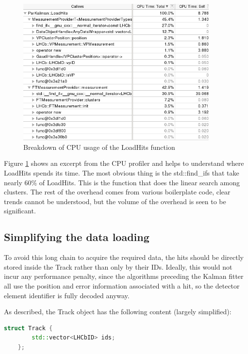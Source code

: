 \documentclass[12pt]{article}
\begin{document}
\begin{figure}[H]
	\begin{center}
		\includegraphics[width=0.9\textwidth]{kalmanfit_loadhits_breakdown}
	\end{center}
	\caption{Breakdown of CPU usage of the LoadHits function}
	\label{fig_kalmanfit_loadhits_breakdown}
\end{figure}

Figure \ref{fig_kalmanfit_loadhits_breakdown} shows an excerpt from the CPU profiler and helps to understand where LoadHits spends its time. The most obvious thing is the std::find\_ifs that take nearly 60\% of LoadHits. This is the function that does the linear search among clusters. The rest of the overhead comes from various boilerplate code, clear trends cannot be understood, but the volume of the overhead is seen to be significant.


\subsection{Simplifying the data loading}

To avoid this long chain to acquire the required data, the hits should be directly stored inside the Track rather than only by their IDs. Ideally, this would not incur any performance penalty, since the algorithms preceding the Kalman fitter all use the position and error information associated with a hit, so the detector element identifier is fully decoded anyway.

As described, the Track object has the following content (largely simplified):
\begin{lstlisting}[language=C++]
	struct Track {
		std::vector<LHCbID> ids;
	};
\end{lstlisting}
\end{document}

